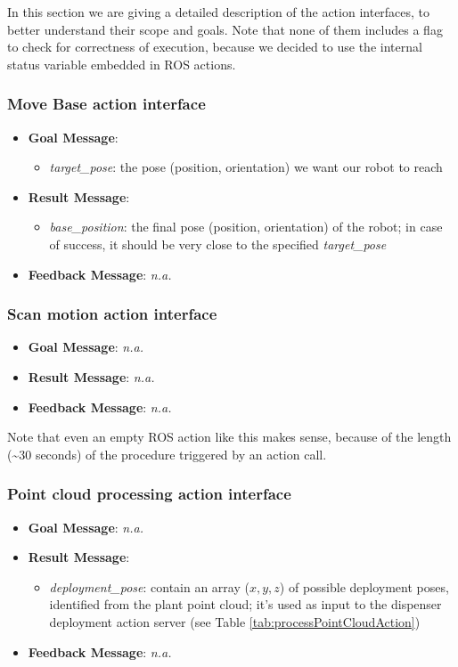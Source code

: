In this section we are giving a detailed description of the action interfaces, to better understand their scope and goals. Note that none of them includes a flag to check for correctness of execution, because we decided to use the internal status variable embedded in \ac{ROS} actions.

\subsubsection{Move Base action interface}
\begin{itemize}
	\item \textbf{Goal Message}:
		\begin{itemize}
			\item \textit{target\_pose}: the pose (position, orientation) we want our robot to reach
		\end{itemize} 
	\item  \textbf{Result Message}:
		\begin{itemize}
			\item \textit{base\_position}: the final pose (position, orientation) of the robot; in case of success, it should be very close to the specified \textit{target\_pose}
		\end{itemize} 
	\item  \textbf{Feedback Message}: \textit{n.a.}
\end{itemize}

\subsubsection{Scan motion action interface}
\begin{itemize}
	\item \textbf{Goal Message}: \textit{n.a.}
	\item  \textbf{Result Message}: \textit{n.a.}
	\item  \textbf{Feedback Message}: \textit{n.a.}
\end{itemize}
Note that even an empty \ac{ROS} action like this makes sense, because of the length (\textasciitilde30 seconds) of the procedure triggered by an action call.

\subsubsection{Point cloud processing action interface}
\begin{itemize}
	\item \textbf{Goal Message}: \textit{n.a.}
	\item  \textbf{Result Message}: 
		\begin{itemize}
			\item \textit{deployment\_pose}: contain an array ($x,y,z$) of possible deployment poses, identified from the plant point cloud; it's used as input to the dispenser deployment action server (see Table \ref{tab:processPointCloudAction})
		\end{itemize}
	\item  \textbf{Feedback Message}: \textit{n.a.}
\end{itemize}

